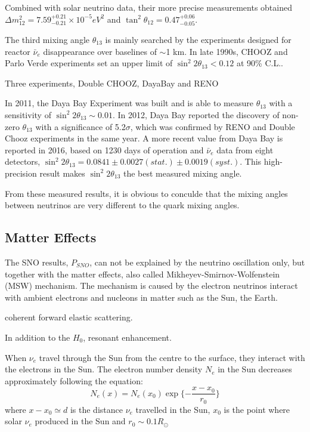 \documentclass[preprint,12pt]{elsarticle}
\begin{document}
Combined with solar neutrino data, their more precise measurements obtained $\Delta m^2_{12} = 7.59^{+0.21}_{-0.21}\times 10^{-5}eV^2$ and $\tan^2{\theta}_{12}=0.47^{+0.06}_{-0.05}$\cite{kamland_measure}.





The third mixing angle $\theta_{13}$ is mainly searched by the experiments designed for reactor $\bar{\nu}_e$ disappearance over baselines of $\sim$1 km. In late 1990s, CHOOZ and Parlo Verde experiments set an upper limit of $\sin^2 2\theta_{13}<0.12$ at 90\% C.L.\cite{joseTextbook}.

Three experiments, Double CHOOZ, DayaBay and RENO 

In 2011, the Daya Bay Experiment was built and is able to measure $\theta_{13}$ with a sensitivity of $\sin^2 2\theta_{13}\sim 0.01$.
In 2012, Daya Bay reported the discovery of non-zero $\theta_{13}$ with a significance of 5.2$\sigma$, which was confirmed by RENO and Double Chooz experiments in the same year. A more recent value from Daya Bay is reported in 2016\cite{dayabayresults}, based on 1230 days of operation and $\bar{\nu}_e$ data from eight detectors, $\sin^2 2\theta_{13} = 0.0841\pm0.0027(stat.)\pm0.0019(syst.)$. This high-precision result makes $\sin^2 2\theta_{13}$ the best measured mixing angle\cite{reactorNu}. 

From these measured results, it is obvious to conculde that the mixing angles between neutrinos are very different to the quark mixing angles. 




\subsection{Matter Effects}
The SNO results, $P_{SNO}$, can not be explained by the neutrino oscillation only, but together with the matter effects, also called Mikheyev-Smirnov-Wolfenstein (MSW) mechanism. The mechanism is caused by the electron neutrinos interact with ambient electrons and nucleons in matter such as the Sun, the Earth.

coherent forward elastic scattering.


In addition to the $H_0$,   
resonant enhancement.



When $\nu_e$ travel through the Sun from the centre to the surface, they interact with the electrons in the Sun. The electron number density $N_e$ in the Sun decreases approximately following the equation: 
\[
N_e(x)=N_e(x_0)\exp\{-\frac{x-x_0}{r_0}\}
\]
where $x-x_0\simeq d$ is the distance $\nu_e$ travelled in the Sun, $x_0$ is the point where solar $\nu_e$ produced in the Sun and $r_0\sim 0.1R_{\odot}$ 
\end{document}
